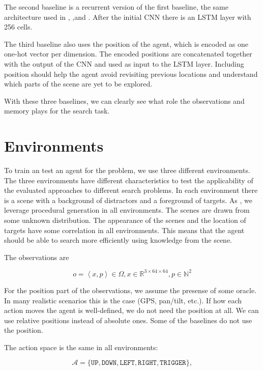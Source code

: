 The second baseline is a recurrent version of the first baseline, the same architecture used in \cite{mnih_asynchronous_2016}, \cite{mirowski_navigate_2017},and \cite{gupta_cognitive_2019}.
After the initial CNN there is an LSTM layer with 256 cells.

The third baseline also uses the position of the agent, which is encoded as one one-hot vector per dimension. 
The encoded positions are concatenated together with the output of the CNN and used as input to the LSTM layer.
Including position should help the agent avoid revisiting previous locations and understand which parts of the scene are yet to be explored. 

With these three baselines, we can clearly see what role the observations and memory plays for the search task.

\section{Environments}
\label{sec:environments}

To train an test an agent for the problem, we use three different environments.
The three environments have different characteristics to test the applicability of the evaluated approaches to different search problems.
In each environment there is a scene with a background of distractors and a foreground of targets.
As \cite{cobbe_procgen_2020,mnih_asynchronous_2016}, we leverage procedural generation in all environments.
The scenes are drawn from some unknown distribution.
The appearance of the scenes and the location of targets have some correlation in all environments.
This means that the agent should be able to search more efficiently using knowledge from the scene.

The observations are

\[
    o = \left\langle x, p \right\rangle \in \Omega, x \in \mathbb{R}^{3 \times 64 \times 64}, p \in \mathbb{N}^2
\]

For the position part of the observations, we assume the presense of some oracle.
In many realistic scenarios this is the case (GPS, pan/tilt, etc.).
If how each action moves the agent is well-defined, we do not need the position at all.
We can use relative positions instead of absolute ones.
Some of the baselines do not use the position.

The action space is the same in all environments:

\[
    \mathcal{A} = \lbrace \mathtt{UP}, \mathtt{DOWN}, \mathtt{LEFT}, \mathtt{RIGHT}, \mathtt{TRIGGER} \rbrace,
\]

